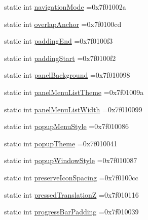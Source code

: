 \begin{DoxyCompactItemize}
\item 
static int \hyperlink{classandroid_1_1support_1_1graphics_1_1drawable_1_1animated_1_1R_1_1attr_aeb8e16d2b710e633fa1af4feffe9f30f}{navigation\+Mode} =0x7f01002a
\item 
static int \hyperlink{classandroid_1_1support_1_1graphics_1_1drawable_1_1animated_1_1R_1_1attr_adf69c9f902792de9a65be83438bd4501}{overlap\+Anchor} =0x7f0100cd
\item 
static int \hyperlink{classandroid_1_1support_1_1graphics_1_1drawable_1_1animated_1_1R_1_1attr_a96faf2bc21f2436f652ba47178658063}{padding\+End} =0x7f0100f3
\item 
static int \hyperlink{classandroid_1_1support_1_1graphics_1_1drawable_1_1animated_1_1R_1_1attr_abd748e5a2c62055fe2bfc6c666a4cb3b}{padding\+Start} =0x7f0100f2
\item 
static int \hyperlink{classandroid_1_1support_1_1graphics_1_1drawable_1_1animated_1_1R_1_1attr_aa1113b6d76fd1d7150bf442abb6a449f}{panel\+Background} =0x7f010098
\item 
static int \hyperlink{classandroid_1_1support_1_1graphics_1_1drawable_1_1animated_1_1R_1_1attr_a49d0352563d3d7c90f8d124b9b69704a}{panel\+Menu\+List\+Theme} =0x7f01009a
\item 
static int \hyperlink{classandroid_1_1support_1_1graphics_1_1drawable_1_1animated_1_1R_1_1attr_aad004005f94071e4e0a04376567b3c86}{panel\+Menu\+List\+Width} =0x7f010099
\item 
static int \hyperlink{classandroid_1_1support_1_1graphics_1_1drawable_1_1animated_1_1R_1_1attr_a831d1fe21db2e00f27e46cb9e2c01b0f}{popup\+Menu\+Style} =0x7f010086
\item 
static int \hyperlink{classandroid_1_1support_1_1graphics_1_1drawable_1_1animated_1_1R_1_1attr_adb420ab865f2b2baccbaf58e84118378}{popup\+Theme} =0x7f010041
\item 
static int \hyperlink{classandroid_1_1support_1_1graphics_1_1drawable_1_1animated_1_1R_1_1attr_a2c477f38f7a47e2bfdf735c8edc53421}{popup\+Window\+Style} =0x7f010087
\item 
static int \hyperlink{classandroid_1_1support_1_1graphics_1_1drawable_1_1animated_1_1R_1_1attr_aa16be5053c4522b5623b88d51185974f}{preserve\+Icon\+Spacing} =0x7f0100cc
\item 
static int \hyperlink{classandroid_1_1support_1_1graphics_1_1drawable_1_1animated_1_1R_1_1attr_a898fa8e367e2dab5497648745b740d65}{pressed\+TranslationZ} =0x7f010116
\item 
static int \hyperlink{classandroid_1_1support_1_1graphics_1_1drawable_1_1animated_1_1R_1_1attr_a8f92a1516913e804d40386858e248a11}{progress\+Bar\+Padding} =0x7f010039

\end{DoxyCompactItemize}
